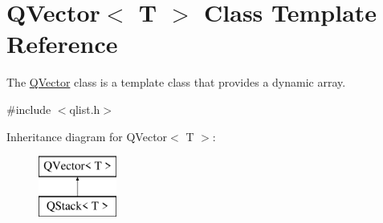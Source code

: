 \hypertarget{class_q_vector}{}\section{Q\+Vector$<$ T $>$ Class Template Reference}
\label{class_q_vector}


The \hyperlink{class_q_vector}{Q\+Vector} class is a template class that provides a dynamic array.  




{\ttfamily \#include $<$qlist.\+h$>$}

Inheritance diagram for Q\+Vector$<$ T $>$\+:\begin{figure}[H]
\begin{center}
\leavevmode
\includegraphics[height=2.000000cm]{class_q_vector}
\end{center}
\end{figure}
